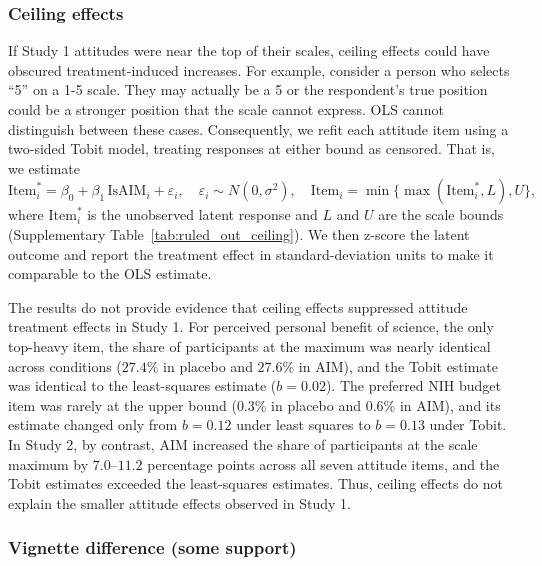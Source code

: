 \documentclass[11pt]{article}
\begin{document}
{\footnotesize

}

\subsubsection{Ceiling effects}
\label{sec:si-ceiling-effects}

If Study 1 attitudes were near the top of their scales, ceiling effects could have obscured treatment-induced increases. For example, consider a person who selects ``5'' on a 1-5 scale. They may actually be a 5 or the respondent's true position could be a stronger position that the scale cannot express. OLS cannot distinguish between these cases. Consequently, we refit each attitude item using a two-sided Tobit model, treating responses at either bound as censored. That is, we estimate
\begin{equation*}
\text{Item}^*_i = \beta_0 + \beta_1\,\text{IsAIM}_i + \varepsilon_i, \quad \varepsilon_i \sim N(0, \sigma^2), \quad
\text{Item}_i = \min\{\max(\text{Item}^*_i, L), U\},
\end{equation*}
where $\text{Item}^*_i$ is the unobserved latent response and $L$ and $U$ are the scale bounds (Supplementary Table~\ref{tab:ruled_out_ceiling}). We then z-score the latent outcome and report the treatment effect in standard-deviation units to make it comparable to the OLS estimate.

The results do not provide evidence that ceiling effects suppressed attitude treatment effects in Study 1. For perceived personal benefit of science, the only top-heavy item, the share of participants at the maximum was nearly identical across conditions ($27.4\%$ in placebo and $27.6\%$ in AIM), and the Tobit estimate was identical to the least-squares estimate ($b=0.02$). The preferred NIH budget item was rarely at the upper bound ($0.3\%$ in placebo and $0.6\%$ in AIM), and its estimate changed only from $b=0.12$ under least squares to $b=0.13$ under Tobit. In Study 2, by contrast, AIM increased the share of participants at the scale maximum by $7.0$--$11.2$ percentage points across all seven attitude items, and the Tobit estimates exceeded the least-squares estimates. Thus, ceiling effects do not explain the smaller attitude effects observed in Study 1.


{\footnotesize

}

\subsubsection{Vignette difference (some support)}
\label{sec:si-vignette-difference}
\end{document}
